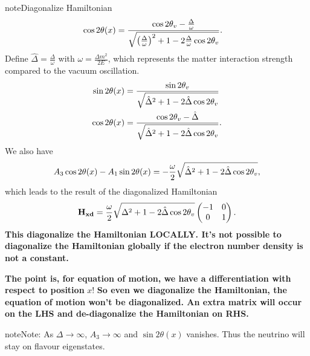\documentclass[letterpaper,12pt,english]{sphinxmanual}
\begin{document}
\begin{notice}{note}{Diagonalize Hamiltonian}
\begin{gather}
\begin{split}
\cos 2\theta(x)&= \frac{ \cos 2\theta_v - \frac{\Delta}{\omega} }{ \sqrt{ \left( \frac{\Delta}{\omega} \right)^2  +1 - 2 \frac{\Delta}{\omega}\cos 2\theta_v  }}.\end{split}\notag
\end{gather}
Define \(\hat\Delta = \frac{\Delta}{\omega}\) with \(\omega=\frac{\Delta m^2}{2E}\), which represents the matter interaction strength compared to the vacuum oscillation.
\begin{gather}
\begin{split}\sin 2\theta(x)  &= \frac{\sin 2\theta_v}{\sqrt{ \hat\Delta ^2+1 - 2 \hat\Delta \cos 2\theta_v }} \\
\cos 2\theta(x)&= \frac{ \cos 2\theta_v - \hat\Delta  }{ \sqrt{\hat\Delta ^2  +1 - 2 \hat\Delta \cos 2\theta_v } }.\end{split}\notag
\end{gather}
We also have
\begin{gather}
\begin{split}A_3\cos 2\theta(x) - A_1 \sin 2\theta(x) = -\frac{\omega}{2}\sqrt{\hat \Delta^2 +1 - 2\hat\Delta \cos 2\theta_v},\end{split}\notag
\end{gather}
which leads to the result of the diagonalized Hamiltonian
\begin{gather}
\begin{split}\mathbf{H_{xd}} = \frac{\omega}{2}\sqrt{\Delta^2 +1 - 2\hat\Delta \cos 2\theta_v} \begin{pmatrix}
-1 & 0 \\
0 & 1
\end{pmatrix}.\end{split}\notag
\end{gather}
\textbf{This diagonalize the Hamiltonian LOCALLY. It's not possible to diagonalize the Hamiltonian globally if the electron number density is not a constant.}

\textbf{The point is, for equation of motion, we have a differentiation with respect to position} \(x\)! \textbf{So even we diagonalize the Hamiltonian, the equation of motion won't be diagonalized. An extra matrix will occur on the LHS and de-diagonalize the Hamiltonian on RHS.}
\end{notice}

\begin{notice}{note}{Note:}
As \(\Delta \to \infty\), \(A_3\to \infty\) and \(\sin 2\theta(x)\) vanishes. Thus the neutrino will stay on flavour eigenstates.
\end{notice}
\end{document}

